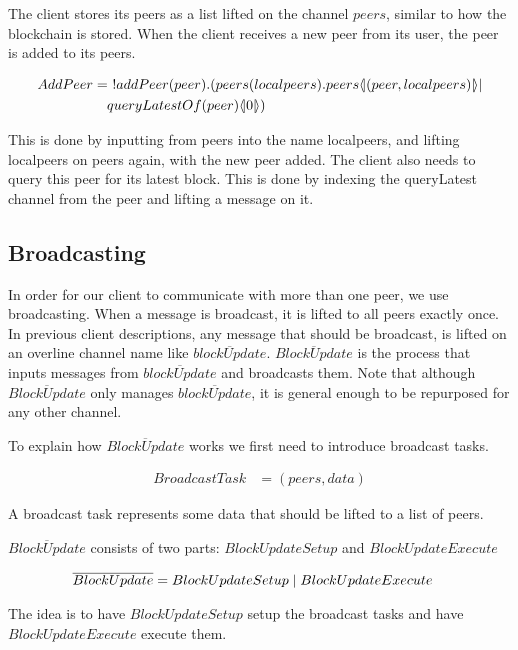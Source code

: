 The client stores its peers as a list lifted on the channel $peers$, similar to how the blockchain is stored.
When the client receives a new peer from its user, the peer is added to its peers.

\begin{align*}
    AddPeer &=\ !addPeer(peer).(peers(localpeers).peers\lift{}{(peer,localpeers)}|\\
        &\quad queryLatestOf(peer)\lift{}{0})\\
\end{align*}

This is done by inputting from peers into the name localpeers, and lifting localpeers on peers again, with the new peer added.
The client also needs to query this peer for its latest block.
This is done by indexing the queryLatest channel from the peer and lifting a message on it.

\subsection{Broadcasting}
In order for our client to communicate with more than one peer, we use broadcasting.
When a message is broadcast, it is lifted to all peers exactly once.
In previous client descriptions, any message that should be broadcast, is lifted on an overline channel name like $\overline{blockUpdate}$.
$\overline{BlockUpdate}$ is the process that inputs messages from $\overline{blockUpdate}$ and broadcasts them.
Note that although $\overline{BlockUpdate}$ only manages $\overline{blockUpdate}$, it is general enough to be repurposed for any other channel.

To explain how $\overline{BlockUpdate}$ works we first need to introduce broadcast tasks.

\begin{align*}
    BroadcastTask &= (peers, data)
\end{align*}

A broadcast task represents some data that should be lifted to a list of peers.

$\overline{BlockUpdate}$ consists of two parts: $BlockUpdateSetup$ and $BlockUpdateExecute$

\begin{align*}
    \overline{BlockUpdate} &= BlockUpdateSetup \mid BlockUpdateExecute
\end{align*}

The idea is to have $BlockUpdateSetup$ setup the broadcast tasks and have $BlockUpdateExecute$ execute them.

